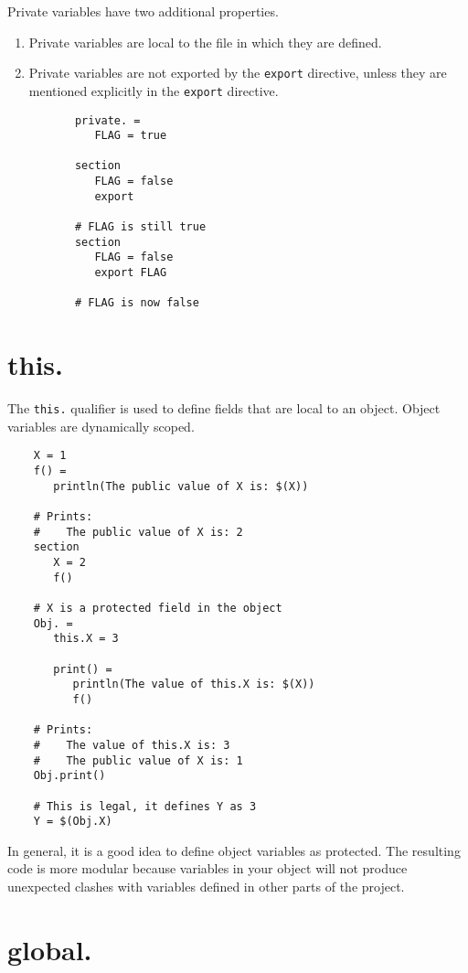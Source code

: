 Private variables have two additional properties.

\begin{enumerate}
\item Private variables are local to the file in which they are defined.
\item Private variables are not exported by the \verb+export+ directive, unless they are
  mentioned explicitly in the \verb+export+ directive.

  \begin{verbatim}
       private. =
          FLAG = true

       section
          FLAG = false
          export

       # FLAG is still true
       section
          FLAG = false
          export FLAG

       # FLAG is now false
  \end{verbatim}
\end{enumerate}

\section{this.}

The \verb+this.+ qualifier is used to define fields that are local to an object.
Object variables are dynamically scoped.

\begin{verbatim}
    X = 1
    f() =
       println(The public value of X is: $(X))

    # Prints:
    #    The public value of X is: 2
    section
       X = 2
       f()

    # X is a protected field in the object
    Obj. =
       this.X = 3

       print() =
          println(The value of this.X is: $(X))
          f()

    # Prints:
    #    The value of this.X is: 3
    #    The public value of X is: 1
    Obj.print()

    # This is legal, it defines Y as 3
    Y = $(Obj.X)
\end{verbatim}

In general, it is a good idea to define object variables as protected.  The resulting code is more
modular because variables in your object will not produce unexpected clashes with variables defined
in other parts of the project.

\section{global.}
\label{section:global}

